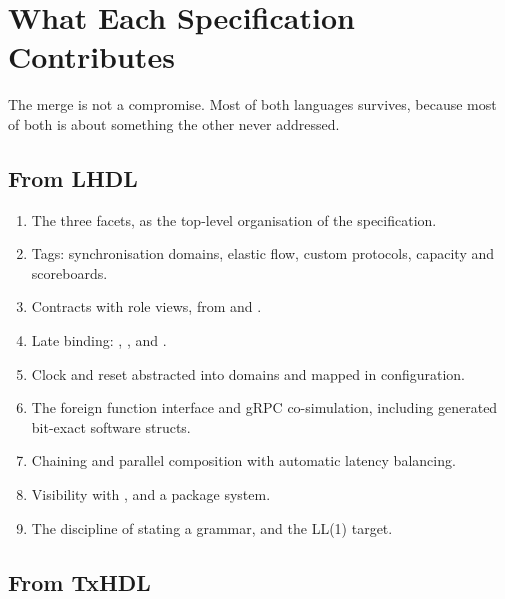 \section{What Each Specification Contributes}
\label{sec:contributions}

The merge is not a compromise. Most of both languages survives, because most
of both is about something the other never addressed.

\subsection{From LHDL}

\begin{enumerate}
  \item The three facets, as the top-level organisation of the
        specification.
  \item Tags: synchronisation domains, elastic flow, custom protocols,
        capacity and scoreboards.
  \item Contracts with role views, from  and
        .
  \item Late binding: , ,  and
        .
  \item Clock and reset abstracted into domains and mapped in
        configuration.
  \item The foreign function interface and gRPC co-simulation, including
        generated bit-exact software structs.
  \item Chaining and parallel composition with automatic latency
        balancing.
  \item Visibility with , and a package system.
  \item The discipline of stating a grammar, and the LL(1) target.
\end{enumerate}

\subsection{From TxHDL}

